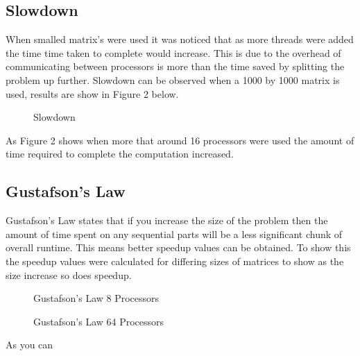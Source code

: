 \documentclass{article}
\begin{document}
\subsection{Slowdown}

When smalled matrix's were used it was noticed that as more threads were added the
time time taken to complete would increase. This is due to the overhead of communicating
between processors is more than the time saved by splitting the problem up further.
Slowdown can be observed when a 1000 by 1000 matrix is used, results are show in Figure 2
below.

\begin{figure}[H]
 \centering
 \caption{Slowdown}
 \label{fig:slowdown}
 \end{figure}

As Figure 2 shows when more that around 16 processors were used the amount of time
required to complete the computation increased.

\subsection{Gustafson's Law}

Gustafson's Law states that if you increase the size of the problem then the amount of
time spent on any sequential parts will be a less significant chunk of overall runtime.
This means better speedup values can be obtained. To show this the speedup values were
calculated for differing sizes of matrices to show as the size increase so does
speedup.

\begin{figure}[H]
 \centering
 \caption{Gustafson's Law 8 Processors}
 \label{fig:slowdown}
 \end{figure}

 \begin{figure}[H]
  \centering
  \caption{Gustafson's Law 64 Processors}
  \label{fig:slowdown}
  \end{figure}

  As you can
\end{document}
